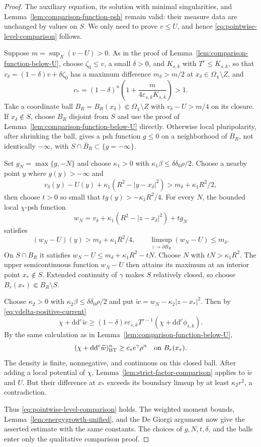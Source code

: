 \documentclass[oneside,english,letterpaper]{amsart}
\numberwithin{equation}{section}
\theoremstyle{plain}
\theoremstyle{definition}
\theoremstyle{remark}
\renewcommand{\d}{\mathrm{d}}
\newcommand{\ddc}{\d\d^c}
\begin{document}
\begin{proof}
	The auxiliary equation, its solution with minimal singularities,
	and Lemma~\ref{lem:comparison-function-psh} remain valid: their
	measure data are unchanged by values on $S$. We only need to prove
	$v\leq U$, and hence \eqref{eq:pointwise-level-comparison} follows.
	
	Suppose $m=\sup_X(v-U)>0$. As in the proof of
	Lemma~\ref{lem:comparison-function-below-U}, choose $\zeta_0\leq v$, a small
	$\delta>0$, and $K_{s,k}$ with $T^r\leq K_{s,k}$, so that
	$v_\delta=(1-\delta)v+\delta\zeta_0$ has a maximum difference
	$m_\delta>m/2$ at $x_\delta\in\Omega_\chi\setminus Z$, and
	\begin{equation}
		\label{eq:extension-strict-factor}
		c_*=(1-\delta)^n\left(1+\frac{m}{4\varepsilon_{s,k} K_{s,k}}\right)>1.
	\end{equation}
	Take a coordinate ball $B_R=B_R(x_\delta)\Subset\Omega_\chi\setminus Z$
	with $v_\delta-U>m/4$ on its closure. If $x_\delta\notin S$, choose
	$B_R$ disjoint from $S$ and use the proof of
	Lemma~\ref{lem:comparison-function-below-U} directly. Otherwise local
	pluripolarity, after shrinking the ball, gives a psh function
	$g\leq0$ on a neighborhood of $\overline B_R$, not identically
	$-\infty$, with $S\cap\overline B_R\subset\{g=-\infty\}$.
	
	Set $g_N=\max\{g,-N\}$ and choose $\kappa_1>0$ with
	$\kappa_1\beta\leq\delta\delta_0\rho/2$. Choose a nearby point
	$y$ where $g(y)>-\infty$ and
	\[
		v_\delta(y)-U(y)+\kappa_1(R^2-|y-x_\delta|^2)
		>m_\delta+\kappa_1R^2/2,
	\]
	then choose $t>0$ so small that $t g(y)>-\kappa_1R^2/4$. For every $N$,
	the bounded local $\chi$-psh function
	\[
	w_N=v_\delta+\kappa_1(R^2-|z-x_\delta|^2)+t g_N
	\]
	satisfies
	\[
	(w_N-U)(y)>m_\delta+\kappa_1R^2/4,
	\qquad \limsup_{z\to\partial B_R}(w_N-U)\leq m_\delta.
	\]
	On $S\cap B_R$ it satisfies
	$w_N-U\leq m_\delta+\kappa_1R^2-tN$.
	Choose $N$ with $tN>\kappa_1R^2$. The upper semicontinuous
	function $w_N-U$ then attains its maximum at an interior point
	$x_*\notin S$. Extended continuity of $\gamma$ makes $S$ relatively
	closed, so choose $B_r(x_*)\Subset B_R\setminus S$.
	
	Choose $\kappa_2>0$ with $\kappa_2\beta\leq\delta\delta_0\rho/2$
	and put $\widetilde w=w_N-\kappa_2|z-x_*|^2$. Then
	by \eqref{eq:vdelta-positive-current}
	\[
	\chi+\ddc\widetilde w
	\geq(1-\delta)r\varepsilon_{s,k} T^{r-1}(\chi+\ddc\phi_{s,k}).
	\]
By the same calculation as in
Lemma~\ref{lem:comparison-function-below-U},
	\[
	(\chi+\ddc\widetilde w)^n_{\mathrm{BT}}\geq c_*e^\gamma\rho^n
	\quad\hbox{on }B_r(x_*).
	\]
	The density is finite, nonnegative, and continuous on this closed
	ball. After adding a local potential of $\chi$,
	Lemma~\ref{lem:strict-factor-comparison} applies to
	$\widetilde w$ and $U$. But their difference at $x_*$ exceeds its
	boundary limsup by at least $\kappa_2r^2$, a contradiction.
	
	Thus \eqref{eq:pointwise-level-comparison} holds. The weighted
	moment bounds, Lemma~\ref{lem:energygrowth-unified}, and the
	De Giorgi argument now give the asserted estimate with the same
	constants. The choices of $g,N,t,\delta$, and the balls enter only
	the qualitative comparison proof.
\end{proof}
\end{document}
